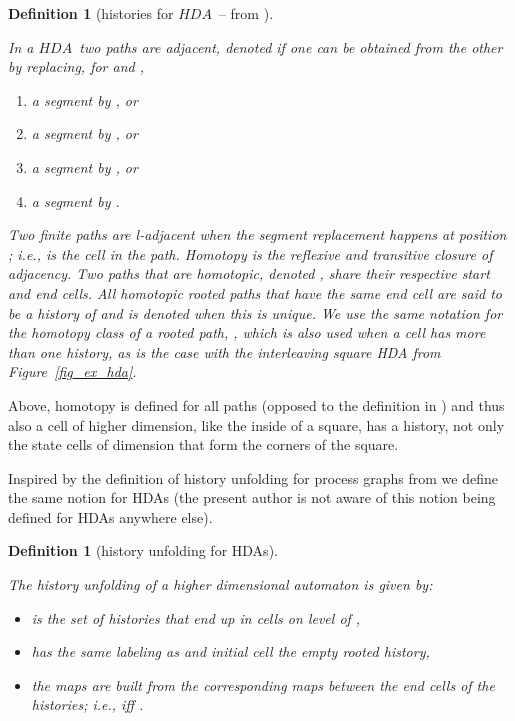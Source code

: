 \documentclass[submission,copyright,creativecommons]{eptcs}
\newtheorem{definition}[theorem]{Definition}
\newcounter{case}
\newcommand\HDA{\ensuremath{\mathit{HDA}}}
\begin{document}
\begin{definition}[histories for \HDA\ -- from {\cite[Sec.7]{Glabbeek06HDA}}]\label{def_history_HDA}\ 

In a \HDA\ two paths are \emph{adjacent}, denoted  if one can be obtained from the other by replacing, for  and ,
\begin{enumerate}
\item a segment  by , or
\item a segment  by , or
\item a segment  by , or
\item a segment  by .
\end{enumerate}
Two finite paths are \textit{l-adjacent}  when the segment replacement happens at position ; i.e.,  is the  cell in the path.
\emph{Homotopy} is the reflexive and transitive closure of adjacency. Two paths that are homotopic, denoted , share their respective start and end cells. All homotopic rooted paths that have the same end cell  are said to be a \emph{history of } and is denoted  when this is unique. We use the same notation for the homotopy class of a rooted path, , which is also used when a cell has more than one history, as is the case with the interleaving square HDA from Figure~\ref{fig_ex_hda}.
\end{definition}

Above, homotopy is defined for all paths (opposed to the definition in \cite[Sec.1.6]{Goubault12Category_Cubical}) and thus also a cell of higher dimension, like the inside of a square, has a history, not only the state cells of dimension  that form the corners of the square.

Inspired by the definition of history unfolding for process graphs from \cite[Sec.3]{glabbeek96histUnfold} we define the same notion for HDAs (the present author is not aware of this notion being defined for HDAs anywhere else).

\begin{definition}[history unfolding for HDAs]\label{def_unfolding_history}\ 

The \emph{history unfolding}  of a higher dimensional automaton  is given by:
\begin{itemize}
\item  is the set of histories that end up in cells on level  of ,
\item has the same labeling as  and initial cell the empty rooted history,
\item the  maps are built from the corresponding maps between the end cells of the histories; i.e.,  iff .
\end{itemize}

\end{definition}
\end{document}
